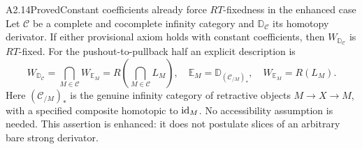 \begin{claim}{A2.14}{Proved}{Constant coefficients already force $RT$-fixedness in the enhanced case}
\label{A2-constant-enhanced-RT}
Let $\mathcal C$ be a complete and cocomplete infinity category and
$\mathbb D_{\mathcal C}$ its homotopy derivator. If either provisional
axiom holds with constant coefficients, then $W_{\mathbb D_{\mathcal C}}$
is $RT$-fixed. For the pushout-to-pullback half an explicit description is
\[
 W_{\mathbb D_{\mathcal C}}
   =\bigcap_{M\in\mathcal C}W_{\mathbb E_M}
   =R\left(\bigcap_{M\in\mathcal C}L_M\right),
 \quad
 \mathbb E_M=\mathbb D_{(\mathcal C_{/M})_*},
 \quad W_{\mathbb E_M}=R(L_M).
 \tag{A2.14.1}
\]
Here $(\mathcal C_{/M})_*$ is the genuine infinity category of retractive
objects $M\to X\to M$, with a specified composite homotopic to $\operatorname{id}_M$.
No accessibility assumption is needed. This assertion is enhanced:
it does not postulate slices of an arbitrary bare strong derivator.
\end{claim}
